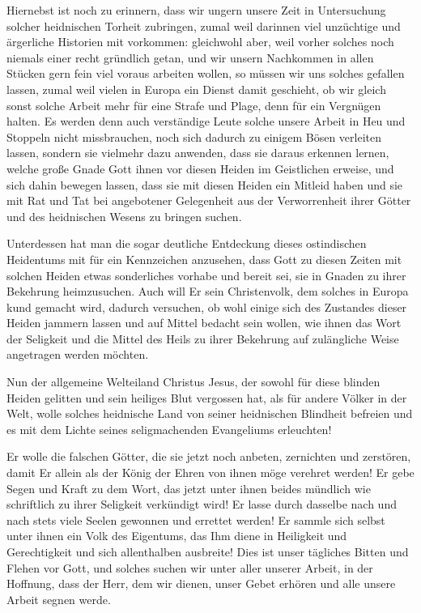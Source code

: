\documentclass{article}
\begin{document}
Hiernebst ist noch zu erinnern, dass wir ungern unsere Zeit in Untersuchung solcher heidnischen Torheit zubringen, zumal weil darinnen viel unzüchtige und ärgerliche Historien mit vorkommen: gleichwohl aber, weil vorher solches noch niemals einer recht gründlich getan, und wir unsern Nachkommen in allen Stücken gern fein viel voraus arbeiten wollen, so müssen wir uns solches gefallen lassen, zumal weil vielen in Europa ein Dienst damit geschieht, ob wir gleich sonst solche Arbeit mehr für eine Strafe und Plage, denn für ein Vergnügen halten. Es werden denn auch verständige Leute solche unsere Arbeit in Heu und Stoppeln nicht missbrauchen, noch sich dadurch zu einigem Bösen verleiten lassen, sondern sie vielmehr dazu anwenden, dass sie daraus erkennen lernen, welche große Gnade Gott ihnen vor diesen Heiden im Geistlichen erweise, und sich dahin bewegen lassen, dass sie mit diesen Heiden ein Mitleid haben und sie mit Rat und Tat bei angebotener Gelegenheit aus der Verworrenheit ihrer Götter und des heidnischen Wesens zu bringen suchen.

Unterdessen hat man die sogar deutliche Entdeckung dieses ostindischen Heidentums mit für ein Kennzeichen anzusehen, dass Gott zu diesen Zeiten mit solchen Heiden etwas sonderliches vorhabe und bereit sei, sie in Gnaden zu ihrer Bekehrung heimzusuchen. Auch will Er sein Christenvolk, dem solches in Europa kund gemacht wird, dadurch versuchen, ob wohl einige sich des Zustandes dieser Heiden jammern lassen und auf Mittel bedacht sein wollen, wie ihnen das Wort der Seligkeit und die Mittel des Heils zu ihrer Bekehrung auf zulängliche Weise angetragen werden möchten.

Nun der allgemeine Welteiland Christus Jesus, der sowohl für diese blinden Heiden gelitten und sein heiliges Blut vergossen hat, als für andere Völker in der Welt, wolle solches heidnische Land von seiner heidnischen Blindheit befreien und es mit dem Lichte seines seligmachenden Evangeliums erleuchten!

Er wolle die falschen Götter, die sie jetzt noch anbeten, zernichten und zerstören, damit Er allein als der König der Ehren von ihnen möge verehret werden! Er gebe Segen und Kraft zu dem Wort, das jetzt unter ihnen beides mündlich wie schriftlich zu ihrer Seligkeit verkündigt wird! Er lasse durch dasselbe nach und nach stets viele Seelen gewonnen und errettet werden! Er sammle sich selbst unter ihnen ein Volk des Eigentums, das Ihm diene in Heiligkeit und Gerechtigkeit und sich allenthalben ausbreite! Dies ist unser tägliches Bitten und Flehen vor Gott, und solches suchen wir unter aller unserer Arbeit, in der Hoffnung, dass der Herr, dem wir dienen, unser Gebet erhören und alle unsere Arbeit segnen werde.
\end{document}
